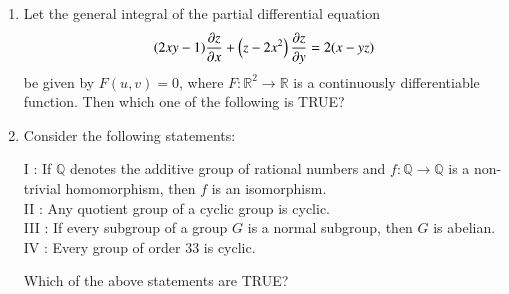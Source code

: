 \documentclass[journal,12pt,onecolumn]{IEEEtran}
\theoremstyle{remark}
\begin{document}
\begin{enumerate}[start=1, label=Q.\arabic*]
\hfill{}


\item Let the general integral of the partial differential equation
\[
(2xy-1)\frac{\partial z}{\partial x} + \left(z-2x^2\right)\frac{\partial z}{\partial y} = 2(x-yz)
\]
be given by $F(u,v)=0$, where $F : \mathbb{R}^2 \to \mathbb{R}$ is a continuously differentiable function.  
Then which one of the following is TRUE?
\begin{enumerate}
\end{enumerate}

\hfill{}


\item Consider the following statements:  

I : If $\mathbb{Q}$ denotes the additive group of rational numbers and $f :\mathbb{Q}\to \mathbb{Q}$ is a non-trivial homomorphism, then $f$ is an isomorphism.\\
II : Any quotient group of a cyclic group is cyclic.\\
III : If every subgroup of a group $G$ is a normal subgroup, then $G$ is abelian.\\
IV : Every group of order $33$ is cyclic.  

Which of the above statements are TRUE?
\begin{enumerate}
\end{enumerate}

\hfill{}


\end{enumerate}
\end{document}
